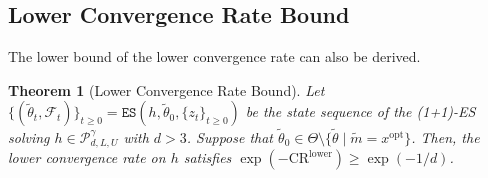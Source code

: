 \documentclass[journal]{IEEEtran}
\renewcommand{\geq}{\geqslant} %
\newtheorem{theorem}{Theorem}[]
\theoremstyle{definition}
\begin{document}
\subsection{Lower Convergence Rate Bound}

The lower bound of the lower convergence rate can also be derived.

\begin{theorem}[Lower Convergence Rate Bound]\label{thm:lowerconvergencerate}
Let $\{(\tilde{\theta}_t, \mathcal{F}_t)\}_{t \geq 0} = \texttt{ES}(h, \tilde{\theta}_0, \{z_t\}_{t \geq 0})$ be the state sequence of the (1+1)-ES solving $h \in \mathcal{P}_{d,L,U}^\gamma$ with $d > 3$. Suppose that $\tilde{\theta}_0 \in \Theta\setminus\{\tilde{\theta}\mid \tilde{m}= x^\mathrm{opt}\}$.
Then, the lower convergence rate on $h$ satisfies $\exp(-\mathrm{CR}^\mathrm{lower}) \geq \exp(-1/d)$.
\end{theorem}
\end{document}
